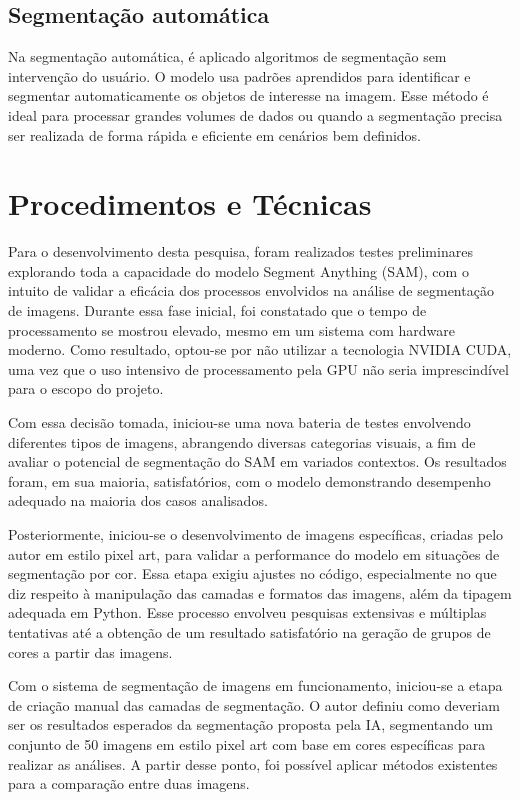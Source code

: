 \subsection{Segmentação automática}
Na segmentação automática, é aplicado algoritmos de segmentação sem intervenção do usuário. 
O modelo usa padrões aprendidos para identificar e segmentar automaticamente os objetos de interesse na imagem. 
Esse método é ideal para processar grandes volumes de dados ou quando a segmentação precisa ser realizada de forma rápida e eficiente em cenários bem definidos.

\section{Procedimentos e Técnicas}

Para o desenvolvimento desta pesquisa, foram realizados testes preliminares explorando toda a capacidade do modelo Segment Anything (SAM), com o intuito de validar a eficácia dos processos envolvidos na análise de segmentação de imagens. Durante essa fase inicial, foi constatado que o tempo de processamento se mostrou elevado, mesmo em um sistema com hardware moderno. Como resultado, optou-se por não utilizar a tecnologia NVIDIA CUDA, uma vez que o uso intensivo de processamento pela GPU não seria imprescindível para o escopo do projeto.

Com essa decisão tomada, iniciou-se uma nova bateria de testes envolvendo diferentes tipos de imagens, abrangendo diversas categorias visuais, a fim de avaliar o potencial de segmentação do SAM em variados contextos. Os resultados foram, em sua maioria, satisfatórios, com o modelo demonstrando desempenho adequado na maioria dos casos analisados.

Posteriormente, iniciou-se o desenvolvimento de imagens específicas, criadas pelo autor em estilo pixel art, para validar a performance do modelo em situações de segmentação por cor. Essa etapa exigiu ajustes no código, especialmente no que diz respeito à manipulação das camadas e formatos das imagens, além da tipagem adequada em Python. Esse processo envolveu pesquisas extensivas e múltiplas tentativas até a obtenção de um resultado satisfatório na geração de grupos de cores a partir das imagens.

Com o sistema de segmentação de imagens em funcionamento, iniciou-se a etapa de criação manual das camadas de segmentação. O autor definiu como deveriam ser os resultados esperados da segmentação proposta pela IA, segmentando um conjunto de 50 imagens em estilo pixel art com base em cores específicas para realizar as análises. A partir desse ponto, foi possível aplicar métodos existentes para a comparação entre duas imagens.

